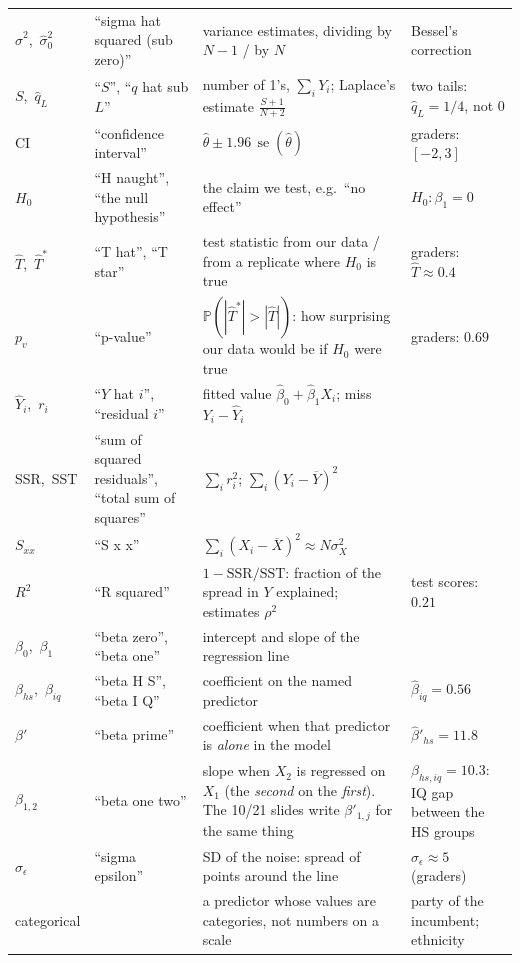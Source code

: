 \documentclass[11pt]{article}
\newcommand{\se}{\operatorname{se}}
\renewcommand{\P}{\mathbb{P}}
\newcommand{\SSR}{\mathrm{SSR}}
\newcommand{\SST}{\mathrm{SST}}
\newcommand{\Ybar}{\overline{Y}}
\newcommand{\Xbar}{\overline{X}}
\begin{document}
{\begin{longtable}{@{}>{\raggedright\arraybackslash}p{2.5cm}>{\raggedright\arraybackslash}p{3.0cm}>{\raggedright\arraybackslash}p{5.5cm}>{\raggedright\arraybackslash}p{4.5cm}@{}}
$\hat\sigma^2$,\ $\hat\sigma_0^2$ & ``sigma hat squared (sub zero)'' & variance estimates, dividing by $N-1$ / by $N$ & Bessel's correction\\
$S$,\ $\hat q_L$ & ``$S$'', ``$q$ hat sub $L$'' & number of 1's, $\sum_iY_i$; Laplace's estimate $\frac{S+1}{N+2}$ & two tails: $\hat q_L=1/4$, not $0$\\
CI & ``confidence interval'' & $\hat\theta\pm1.96\,\se(\hat\theta)$ & graders: $[-2,3]$\\
$H_0$ & ``H naught'', ``the null hypothesis'' & the claim we test, e.g.\ ``no effect'' & $H_0:\beta_1=0$\\
$\hat T$,\ $\hat T^*$ & ``T hat'', ``T star'' & test statistic from our data / from a replicate where $H_0$ is true & graders: $\hat T\approx0.4$\\
$p_v$ & ``p-value'' & $\P(|\hat T^*|>|\hat T|)$: how surprising our data would be if $H_0$ were true & graders: $0.69$\\
$\hat Y_i$,\ $r_i$ & ``$Y$ hat $i$'', ``residual $i$'' & fitted value $\hat\beta_0+\hat\beta_1X_i$; miss $Y_i-\hat Y_i$ & \\
SSR,\ SST & ``sum of squared residuals'', ``total sum of squares'' & $\sum_ir_i^2$; $\sum_i(Y_i-\Ybar)^2$ & \\
$S_{xx}$ & ``S x x'' & $\sum_i(X_i-\Xbar)^2\approx N\sigma_X^2$ & \\
$R^2$ & ``R squared'' & $1-\SSR/\SST$: fraction of the spread in $Y$ explained; estimates $\rho^2$ & test scores: $0.21$\\
$\beta_0$,\ $\beta_1$ & ``beta zero'', ``beta one'' & intercept and slope of the regression line & \\
$\beta_{hs}$,\ $\beta_{iq}$ & ``beta H S'', ``beta I Q'' & coefficient on the named predictor & $\hat\beta_{iq}=0.56$\\
$\beta'$ & ``beta prime'' & coefficient when that predictor is \emph{alone} in the model & $\hat\beta'_{hs}=11.8$\\
$\beta_{1,2}$ & ``beta one two'' & slope when $X_2$ is regressed on $X_1$ (the \emph{second} on the \emph{first}). The 10/21 slides write $\beta'_{1,j}$ for the same thing & $\beta_{hs,iq}=10.3$: IQ gap between the HS groups\\
$\sigma_\epsilon$ & ``sigma epsilon'' & SD of the noise: spread of points around the line & $\hat\sigma_\epsilon\approx5$ (graders)\\
categorical & & a predictor whose values are categories, not numbers on a scale & party of the incumbent; ethnicity\\

\end{longtable}}
\end{document}
